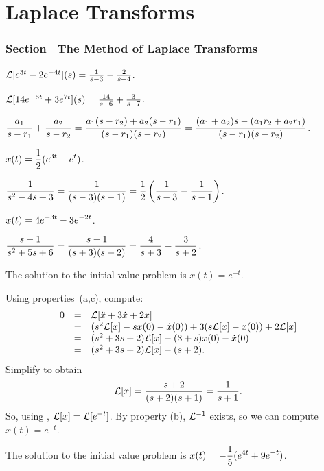 \chapter{Laplace Transforms}

\subsection*{Section~\protect{\ref{S:13.1}} The Method of Laplace Transforms}

 \ans ${\cal L}[e^{3t}-2e^{-4t}](s) = \frac{1}{s-3} -
\frac{2}{s+4}$.

 \ans ${\cal L}[14e^{-6t}+3e^{7t}](s) = \frac{14}{s+6} +
\frac{3}{s-7}$.

 $\displaystyle\frac{a_1}{s-r_1} + \frac{a_2}{s-r_2} = 
\frac{a_1(s-r_2)+a_2(s-r_1)}{(s-r_1)(s-r_2)} =
\frac{(a_1+a_2)s - (a_1r_2+a_2r_1)}{(s-r_1)(s-r_2)}$.


 \ans $\displaystyle x(t) = \frac{1}{2}(e^{3t}-e^t)$.

\soln $\displaystyle\frac{1}{s^2-4s+3} = \frac{1}{(s-3)(s-1)} =
\frac{1}{2}\left(\frac{1}{s-3} - \frac{1}{s-1}\right)$.


 \ans $\displaystyle x(t) = 4e^{-3t}-3e^{-2t}$.

\soln $\displaystyle\frac{s-1}{s^2+5s+6} = \frac{s-1}{(s+3)(s+2)} =
\frac{4}{s+3} - \frac{3}{s+2}$.

 \ans The solution to the initial value problem is
$x(t) = e^{-t}$.

\soln Using properties~(a,c), compute:
\[
\begin{array}{rcl}
0 & = & {\cal L}[\ddot{x} + 3\dot{x} + 2x] \\
& = & (s^2{\cal L}[x] - sx(0) - \dot{x}(0)) + 3(s{\cal L}[x] - x(0))
+ 2{\cal L}[x] \\
& = & (s^2 + 3s + 2){\cal L}[x] - (3 + s)x(0) - \dot{x}(0) \\
& = & (s^2 + 3s + 2){\cal L}[x] - (s + 2).
\end{array}
\]
Simplify to obtain
\[
{\cal L}[x] = \frac{s + 2}{(s + 2)(s + 1)} = \frac{1}{s + 1}.
\]
So, using ,
${\cal L}[x] = {\cal L}[e^{-t}]$.  By property (b),
${\cal L}^{-1}$ exists, so we can compute $x(t) = e^{-t}$.

 \ans The solution to the initial value problem is
$\displaystyle x(t) = -\frac{1}{5}(e^{4t}+9e^{-t})$.

